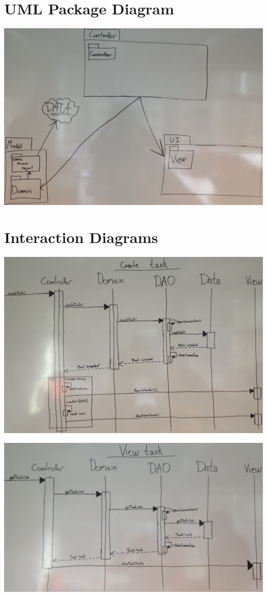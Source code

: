 \documentclass[a4paper, 10pt]{article}
\begin{document}
\section{UML Package Diagram}
\includegraphics[width=\linewidth]{../Pictures/UML_Package_Diagram.jpg}

\section{Interaction Diagrams}
\includegraphics[width=\linewidth]{../Pictures/Interaction_Diagram_Create_Task.jpg}

\includegraphics[width=\linewidth]{../Pictures/Interaction_Diagram_View_Task.jpg}
\end{document}
